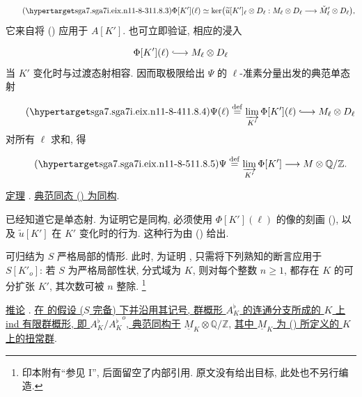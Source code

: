 \begin{equation}\tag{\SGARefTarget{sga7.sga7i.eix.n11-8-3}{11.8.3}}
\Phi[K'](\ell)\simeq
\ker\bigl(\widetilde u[K']_\ell\otimes D_\ell:
 M_\ell\otimes D_\ell\longrightarrow
 \check M'_\ell\otimes D_\ell\bigr),
\end{equation}
它来自将 () 应用于 $A[K']$. 也可立即验证, 相应的浸入

\begin{equation*}
\Phi[K'](\ell)\lhook\joinrel\longrightarrow M_\ell\otimes D_\ell
\end{equation*}
当 $K'$ 变化时与过渡态射相容. 因而取极限给出 $\Psi$ 的 $\ell$-准素分量出发的典范单态射

\begin{equation}\tag{\SGARefTarget{sga7.sga7i.eix.n11-8-4}{11.8.4}}
\Psi(\ell)\mathrel{\mathop{=}^{\mathrm{def}}}
 \varinjlim_{K'}\Phi[K'](\ell)
 \lhook\joinrel\longrightarrow M_\ell\otimes D_\ell
\end{equation}
对所有 $\ell$ 求和, 得

\begin{equation}\tag{\SGARefTarget{sga7.sga7i.eix.n11-8-5}{11.8.5}}
\Psi\mathrel{\mathop{=}^{\mathrm{def}}}
 \varinjlim_{K'}\Phi[K']
 \longrightarrow M\otimes\mathbb Q/\mathbb Z.
\end{equation}

\medskip
\noindent
\underline{定理} . \underline{典范同态 () 为同构}.

已经知道它是单态射. 为证明它是同构, 必须使用 $\Phi[K'](\ell)$ 的像的刻画 (), 以及 $\widetilde u[K']$ 在 $K'$ 变化时的行为. 这种行为由 () 给出.

可归结为 $S$ 严格局部的情形. 此时, 为证明 , 只需将下列熟知的断言应用于 $S[K'_o]$: 若 $S$ 为严格局部性状, 分式域为 $K$, 则对每个整数 $n\geq1$, 都存在 $K$ 的可分扩张 $K'$, 其次数可被 $n$ 整除.
\footnote{印本附有“参见 I”, 后面留空了内部引用. 原文没有给出目标, 此处也不另行编造.}

\medskip
\noindent
\underline{推论} . \underline{在  的假设 ($S$ 完备) 下并沿用其记号, 群概形 $A_K^{\flat}$ 的连通分支所成的 $K$ 上 ind 有限群概形, 即 $A_K^{\flat}/{A_K^{\flat}}^o$, 典范同构于} $\underline M_K\otimes\mathbb Q/\mathbb Z$, \underline{其中 $\underline M_K$ 为 () 所定义的 $K$ 上的扭常群}.

